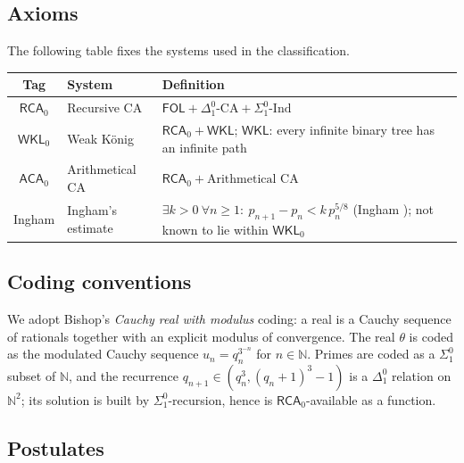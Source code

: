 \documentclass[11pt,reqno]{amsart}
\providecommand{\N}{\mathbb{N}}
\theoremstyle{redplain}
\numberwithin{equation}{section}
\begin{document}
\subsection{Axioms}
\label{sec:axioms-table}

The following table fixes the systems used in the classification.

\begin{center}
{\small
\begin{tabular}{|c|m{2.0cm}|m{9.0cm}|}
\hline
\textbf{Tag} & \textbf{System} & \textbf{Definition}\\
\hline
$\mathsf{RCA}_0$ & Recursive CA
& $\mathsf{FOL}+\Delta^0_1\text{-CA}+\Sigma^0_1\text{-Ind}$\\
\hline
$\mathsf{WKL}_0$ & Weak K\"onig
& $\mathsf{RCA}_0+\mathsf{WKL}$; $\mathsf{WKL}$: every infinite binary tree has an infinite path\\
\hline
$\mathsf{ACA}_0$ & Arithmetical CA
& $\mathsf{RCA}_0+\text{Arithmetical CA}$\\
\hline
Ingham & Ingham's estimate
& $\exists k>0\ \forall n\ge1:\ p_{n+1}-p_n<k\,p_n^{5/8}$ (Ingham \cite{Ingham1937}); not known to lie within $\mathsf{WKL}_0$\\
\hline
\end{tabular}
}
\end{center}

\subsection{Coding conventions}
\label{sec:coding}

\noindent We adopt Bishop's \emph{Cauchy real with modulus} coding: a real
is a Cauchy sequence of rationals together with an explicit modulus of
convergence. The real $\theta$ is coded as the modulated Cauchy sequence
$u_n=q_n^{3^{-n}}$ for $n\in\N$. Primes are coded as a $\Sigma_1^0$
subset of $\N$, and the recurrence
$q_{n+1}\in(q_n^3,(q_n+1)^3-1)$ is a $\Delta_1^0$ relation on $\N^2$;
its solution is built by $\Sigma_1^0$-recursion, hence is
$\mathsf{RCA}_0$-available as a function.

\subsection{Postulates}
\label{sec:postulates}
\end{document}
